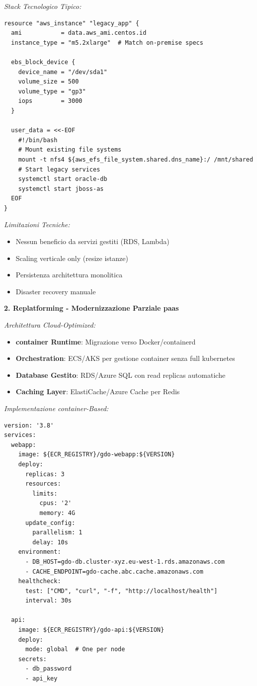 \textit{Stack Tecnologico Tipico:}
\begin{lstlisting}[caption={Terraform per Lift-and-Shift},label={lst:lift_shift}]
resource "aws_instance" "legacy_app" {
  ami           = data.aws_ami.centos.id
  instance_type = "m5.2xlarge"  # Match on-premise specs
  
  ebs_block_device {
    device_name = "/dev/sda1"
    volume_size = 500
    volume_type = "gp3"
    iops        = 3000
  }
  
  user_data = <<-EOF
    #!/bin/bash
    # Mount existing file systems
    mount -t nfs4 ${aws_efs_file_system.shared.dns_name}:/ /mnt/shared
    # Start legacy services
    systemctl start oracle-db
    systemctl start jboss-as
  EOF
}
\end{lstlisting}

\textit{Limitazioni Tecniche:}
\begin{itemize}
    \item Nessun beneficio da servizi gestiti (RDS, Lambda)
    \item Scaling verticale only (resize istanze)
    \item Persistenza architettura monolitica
    \item Disaster recovery manuale
\end{itemize}

\textbf{2. Replatforming - Modernizzazione Parziale \gls{paas}}

\textit{Architettura Cloud-Optimized:}
\begin{itemize}
    \item \textbf{\gls{container} Runtime}: Migrazione verso Docker/\gls{container}d
    \item \textbf{Orchestration}: ECS/AKS per gestione \gls{container} senza full \gls{kubernetes}
    \item \textbf{Database Gestito}: RDS/Azure SQL con read replicas automatiche
    \item \textbf{Caching Layer}: ElastiCache/Azure Cache per Redis
\end{itemize}

\textit{Implementazione \gls{container}-Based:}
\begin{lstlisting}[caption={Docker Compose per Replatforming},label={lst:replatform}]
version: '3.8'
services:
  webapp:
    image: ${ECR_REGISTRY}/gdo-webapp:${VERSION}
    deploy:
      replicas: 3
      resources:
        limits:
          cpus: '2'
          memory: 4G
      update_config:
        parallelism: 1
        delay: 10s
    environment:
      - DB_HOST=gdo-db.cluster-xyz.eu-west-1.rds.amazonaws.com
      - CACHE_ENDPOINT=gdo-cache.abc.cache.amazonaws.com
    healthcheck:
      test: ["CMD", "curl", "-f", "http://localhost/health"]
      interval: 30s
      
  api:
    image: ${ECR_REGISTRY}/gdo-api:${VERSION}
    deploy:
      mode: global  # One per node
    secrets:
      - db_password
      - api_key
\end{lstlisting}

